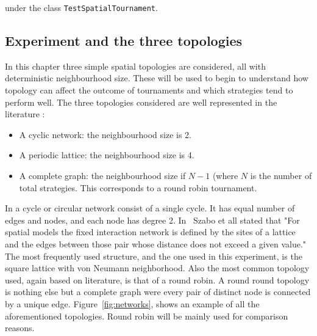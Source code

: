 under the class \texttt{TestSpatialTournament}.





\subsection{Experiment and the three topologies}


In this chapter three simple spatial topologies are considered, all with
deterministic neighbourhood size. These will be used to begin to understand how
topology can affect the outcome of tournaments
and which strategies tend to perform well. The three topologies considered are
well represented in the literature \cite{?}:

\begin{itemize}
    \item A cyclic network: the neighbourhood size is 2. %
    \item A periodic lattice: the neighbourhood size is 4. %
    \item A complete graph: the neighbourhood size if \(N-1\) (where \(N\) is
        the number of total strategies. This corresponds to a round robin
        tournament. %
\end{itemize}

In a cycle or circular network consist of a single cycle. It has
equal number of edges and nodes, and each node has degree 2. In~\cite{Szabo2007}
Szabo et all stated that "For spatial models the fixed interaction network is
defined by the sites of a lattice and the edges between those pair whose distance
does not exceed a given value."  The most frequently used structure, and the one
used in this experiment, is the square lattice with von Neumann neighborhood.
Also the most common topology used, again based on literature, is that of a
round robin. A round round topology is nothing else but a complete
graph were every pair of distinct node is connected by a unique edge.
Figure~\ref{fig:networks}, shows an example of all the aforementioned topologies.
Round robin will be mainly used for comparison reasons.

